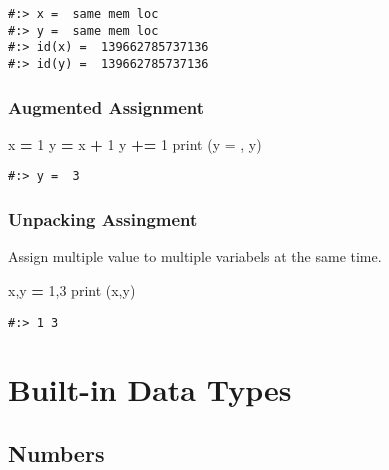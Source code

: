 \documentclass[
]{book}
\newenvironment{Shaded}{\begin{snugshade}}{\end{snugshade}}
\newcommand{\BuiltInTok}[1]{#1}
\newcommand{\DecValTok}[1]{\textcolor[rgb]{0.06,0.06,0.06}{#1}}
\newcommand{\NormalTok}[1]{#1}
\newcommand{\OperatorTok}[1]{\textcolor[rgb]{0.43,0.43,0.43}{\textbf{#1}}}
\newcommand{\StringTok}[1]{\textcolor[rgb]{0.5,0.5,0.5}{#1}}
\begin{document}
\begin{verbatim}
#:> x =  same mem loc 
#:> y =  same mem loc 
#:> id(x) =  139662785737136 
#:> id(y) =  139662785737136
\end{verbatim}

\hypertarget{augmented-assignment}{%
\subsection{Augmented Assignment}\label{augmented-assignment}}

\begin{Shaded}
\begin{Highlighting}[]
\NormalTok{x }\OperatorTok{=} \DecValTok{1}
\NormalTok{y }\OperatorTok{=}\NormalTok{ x }\OperatorTok{+} \DecValTok{1}
\NormalTok{y }\OperatorTok{+=} \DecValTok{1}
\BuiltInTok{print}\NormalTok{ (}\StringTok{\textquotesingle{}y = \textquotesingle{}}\NormalTok{, y)}
\end{Highlighting}
\end{Shaded}

\begin{verbatim}
#:> y =  3
\end{verbatim}

\hypertarget{unpacking-assingment}{%
\subsection{Unpacking Assingment}\label{unpacking-assingment}}

Assign multiple value to multiple variabels at the same time.

\begin{Shaded}
\begin{Highlighting}[]
\NormalTok{x,y }\OperatorTok{=} \DecValTok{1}\NormalTok{,}\DecValTok{3}
\BuiltInTok{print}\NormalTok{ (x,y)}
\end{Highlighting}
\end{Shaded}

\begin{verbatim}
#:> 1 3
\end{verbatim}

\hypertarget{built-in-data-types}{%
\chapter{Built-in Data Types}\label{built-in-data-types}}

\hypertarget{numbers}{%
\section{Numbers}\label{numbers}}
\end{document}
